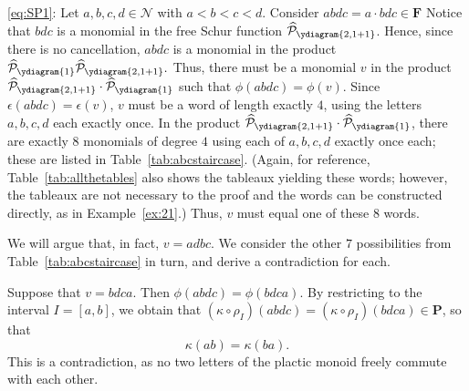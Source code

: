 \documentclass[12 pt]{amsart}
\newcommand{\Plactic}{{\mathbf{P}}}
\newcommand{\Free}{\mathbf{F}}
\newcommand{\sFreeSchur}{\widehat{\mathcal{P}}}
\newcommand{\cN}{\mathcal{N}}
\theoremstyle{remark}
\numberwithin{equation}{section}
\begin{document}
\medbreak
   \eqref{eq:SP1}:
   Let $a,b,c,d \in \cN$ with $a < b < c <d$.
   Consider $abdc = a\cdot bdc \in \Free$ Notice that $bdc$ is a monomial in the free Schur function $\sFreeSchur_{\ydiagram{2,1+1}}$. Hence, since there is no cancellation, $abdc$ is a monomial in the product $\sFreeSchur_{\ydiagram{1}}\sFreeSchur_{\ydiagram{2,1+1}}.$ Thus, 
   there must be a monomial $v$ in the product $\sFreeSchur_{\ydiagram{2,1+1}} \cdot \sFreeSchur_{\ydiagram{1}}$ such that
   $\phi(abdc) = \phi(v)$.
   Since $\epsilon(abdc) = \epsilon(v)$, $v$ must be a word of length exactly $4$, using the letters $a,b,c,d$ each exactly once. In the product $\sFreeSchur_{\ydiagram{2,1+1}}\cdot \sFreeSchur_{\ydiagram{1}} $, there are exactly $8$ monomials of degree $4$ using each of $a,b,c,d$ exactly once each; these are listed in Table~\ref{tab:abcstaircase}. (Again, for reference, Table~\ref{tab:allthetables} also shows the tableaux yielding these words; however, the tableaux are not necessary to the proof and the words can be constructed directly, as in Example~\ref{ex:21}.) Thus, $v$ must equal one of these $8$ words.
   

We will argue that, in fact, $v = adbc$. We consider the other $7$ possibilities from Table~\ref{tab:abcstaircase} in turn, and derive a contradiction for each. 
    
Suppose that $v= bdca$. Then $\phi(abdc) = \phi(bdca)$. By restricting to the interval $I = [a,b]$, we obtain that  $(\kappa \circ \rho_I) (abdc) = (\kappa \circ \rho_I)(bdca) \in \Plactic$, so that
\[
\kappa(ab) = \kappa(ba).
\]
This is a contradiction, as no two letters of the plactic monoid freely commute with each other.

\end{document}
